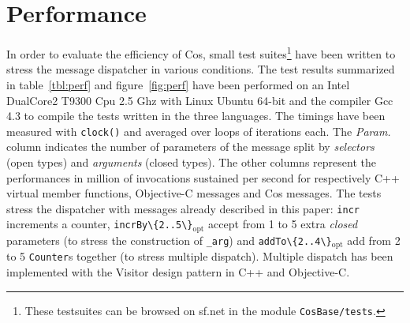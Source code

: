\documentclass[preprint,10pt]{sigplanconf}
\newcommand{\acronym}[1]{{\sc #1}\xspace}
\newcommand{\Cpu}    {\acronym{Cpu}}
\newcommand{\Gcc}    {\acronym{Gcc}}
\newcommand{\ProgLang}[1]{{\sc #1}\xspace}
\newcommand{\Cpp}       {\ProgLang{C{\small ++}}}
\newcommand{\Cos}       {\ProgLang{Cos}}
\newcommand{\Objc}      {\ProgLang{Objective-C}}
\newcommand{\opt}{\ensuremath{_{\text{opt}}}\xspace}
\newcommand{\code}[1]{\lstinline[language=COS,style=samplecode]|#1|}
\begin{document}
\section{Performance\label{sec:perf}}


In order to evaluate the efficiency of \Cos, small test suites\footnote{These testsuites can be browsed on sf.net in the module {\tt CosBase/tests}.} have been written to stress the message dispatcher in various conditions. The test results summarized in table~\ref{tbl:perf} and figure~\ref{fig:perf} have been performed on an Intel DualCore2\texttrademark{} T9300 \Cpu 2.5 Ghz with Linux Ubuntu 64-bit and the compiler \Gcc 4.3 to compile the tests written in the three languages. The timings have been measured with \code{clock()} and averaged over  loops of  iterations each. The {\em Param.} column indicates the number of parameters of the message split by {\em selectors} (open types) and {\em arguments} (closed types). The other columns represent the performances in million of invocations sustained per second for respectively \Cpp virtual member functions, \Objc messages and \Cos messages. The tests stress the dispatcher with messages already described in this paper: \code{incr} increments a counter, \code{incrBy\{2..5\}}\opt accept from 1 to 5 extra {\em closed} parameters (to stress the construction of \code{_arg}) and \code{addTo\{2..4\}}\opt add from 2 to 5 \code{Counter}s together (to stress multiple dispatch). Multiple dispatch has been implemented with the Visitor design pattern in \Cpp and \Objc.
\end{document}
